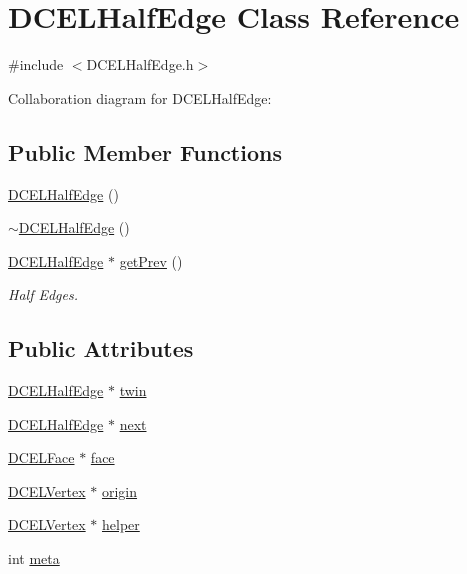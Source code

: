 \hypertarget{classDCELHalfEdge}{}\section{D\+C\+E\+L\+Half\+Edge Class Reference}
\label{classDCELHalfEdge}


{\ttfamily \#include $<$D\+C\+E\+L\+Half\+Edge.\+h$>$}



Collaboration diagram for D\+C\+E\+L\+Half\+Edge\+:
\subsection*{Public Member Functions}
\begin{DoxyCompactItemize}
\item 
\hyperlink{classDCELHalfEdge_a4424375175bfa53fddf16899b0c0d8e1}{D\+C\+E\+L\+Half\+Edge} ()
\item 
\hyperlink{classDCELHalfEdge_af8485b9ee056734ff3d06e5bab24241f}{$\sim$\+D\+C\+E\+L\+Half\+Edge} ()
\item 
\hyperlink{classDCELHalfEdge}{D\+C\+E\+L\+Half\+Edge} $\ast$ \hyperlink{classDCELHalfEdge_ab6d676209796f1a885656f0ed54d5399}{get\+Prev} ()
\begin{DoxyCompactList}\small\item\em Half Edges. \end{DoxyCompactList}\end{DoxyCompactItemize}
\subsection*{Public Attributes}
\begin{DoxyCompactItemize}
\item 
\hyperlink{classDCELHalfEdge}{D\+C\+E\+L\+Half\+Edge} $\ast$ \hyperlink{classDCELHalfEdge_a26f41516925913df2666f32cfaa9a6a9}{twin}
\item 
\hyperlink{classDCELHalfEdge}{D\+C\+E\+L\+Half\+Edge} $\ast$ \hyperlink{classDCELHalfEdge_a7a2d43817186337439468eb238c6bce2}{next}
\item 
\hyperlink{classDCELFace}{D\+C\+E\+L\+Face} $\ast$ \hyperlink{classDCELHalfEdge_ade69d0ad23d0776ed6c925490d7cb4da}{face}
\item 
\hyperlink{classDCELVertex}{D\+C\+E\+L\+Vertex} $\ast$ \hyperlink{classDCELHalfEdge_a43a9bcc720748208b21efda5b2013c3c}{origin}
\item 
\hyperlink{classDCELVertex}{D\+C\+E\+L\+Vertex} $\ast$ \hyperlink{classDCELHalfEdge_abb62faec9db2295a63ab07e665c826e8}{helper}
\item 
int \hyperlink{classDCELHalfEdge_a42d420a68a28f72d360e145b571382d8}{meta}
\end{DoxyCompactItemize}


